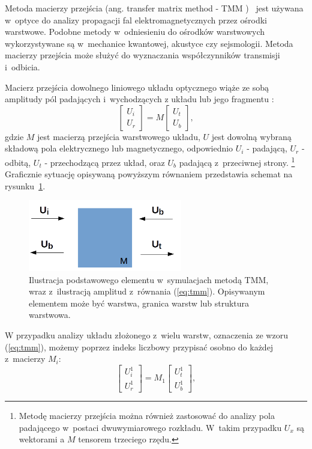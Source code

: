 \label{subart:tmm}
Metoda macierzy przejścia  (ang. transfer matrix method - TMM )~\cite{teich1991fundamentalsTMM} jest używana w~optyce do analizy propagacji fal elektromagnetycznych przez ośrodki warstwowe. Podobne metody w~odniesieniu do ośrodków warstwowych wykorzystywane są w~mechanice kwantowej, akustyce czy sejsmologii. Metoda macierzy przejścia może służyć do wyznaczania współczynników transmisji i~odbicia.

Macierz przejścia dowolnego liniowego układu optycznego wiąże ze sobą amplitudy pól padających i~wychodzących z układu lub jego fragmentu \cite{markos2008wave,teich1991fundamentalsTMM}:
\begin{equation}
\begin{bmatrix}
U_i \\ 
U_r
\end{bmatrix}
= M 
\begin{bmatrix}
U_t \\
U_b
\end{bmatrix},
\label{eq:tmm}
\end{equation}
gdzie $M$ jest macierzą przejścia warstwowego układu, $U$ jest dowolną wybraną składową pola elektrycznego lub magnetycznego, odpowiednio $U_i$ - padającą, $U_r$ - odbitą, $U_t$ - przechodzącą przez układ, oraz $U_b$ padającą  z~przeciwnej strony. \footnote{Metodę macierzy przejścia można również zastosować do analizy pola padającego w~postaci dwuwymiarowego rozkładu. W~takim przypadku $U_x$ są wektorami a $M$ tensorem trzeciego rzędu.} Graficznie sytuację opisywaną powyższym równaniem przedstawia schemat na rysunku~\ref{fig:tmm-simple}.

\begin{figure}
	\includegraphics[width=0.6\textwidth]{images/tmm.png}
	\caption{Ilustracja podstawowego elementu w~symulacjach metodą TMM, wraz z~ilustracją amplitud z~równania (\ref{eq:tmm}). Opisywanym elementem może być warstwa, granica warstw lub struktura warstwowa. }
	\label{fig:tmm-simple}
\end{figure}

W przypadku analizy układu złożonego z~wielu warstw, oznaczenia ze wzoru (\ref{eq:tmm}), możemy poprzez indeks liczbowy przypisać osobno do każdej z~macierzy $M_i$:
\begin{equation}
\begin{bmatrix}
U_i^1 \\ 
U_r^1
\end{bmatrix}
= M_1 
\begin{bmatrix}
U_t^1 \\
U_b^1
\end{bmatrix},
\label{eq:tmm-1l}
\end{equation}

